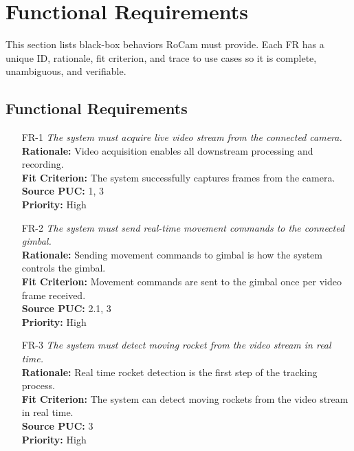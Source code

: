 \documentclass[12pt]{article}
\begin{document}
\section{Functional Requirements}
This section lists black-box behaviors RoCam must provide. Each FR has a unique
ID, rationale, fit criterion, and trace to use cases so it is complete,
unambiguous, and verifiable.

\subsection{Functional Requirements}

\begin{itemize}[leftmargin=*]

  \item[FR-1] \emph{The system must acquire live video stream from the connected
          camera.}\\[2mm]
        \textbf{Rationale:} Video acquisition enables all downstream processing and recording.\\
        \textbf{Fit Criterion:} The system successfully captures frames from the camera.\\
        \textbf{Source PUC:} 1, 3 \\
        \textbf{Priority:} High

  \item[FR-2] \emph{The system must send real-time movement commands to the connected
          gimbal.}\\[2mm]
        \textbf{Rationale:} Sending movement commands to gimbal is how the system controls the gimbal.\\
        \textbf{Fit Criterion:} Movement commands are sent to the gimbal once per video frame received.\\
        \textbf{Source PUC:} 2.1, 3 \\
        \textbf{Priority:} High

  \item[FR-3] \emph{The system must detect moving rocket from the video stream in real
          time.}\\[2mm]
        \textbf{Rationale:} Real time rocket detection is the first step of the tracking process.\\
        \textbf{Fit Criterion:} The system can detect moving rockets from the video stream in real time.\\
        \textbf{Source PUC:} 3 \\
        \textbf{Priority:} High


\end{itemize}
\end{document}
